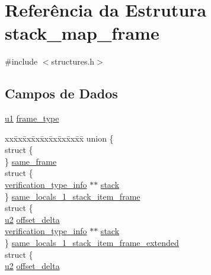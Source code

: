 \hypertarget{structstack__map__frame}{}\section{Referência da Estrutura stack\+\_\+map\+\_\+frame}
\label{structstack__map__frame}


{\ttfamily \#include $<$structures.\+h$>$}

\subsection*{Campos de Dados}
\begin{DoxyCompactItemize}
\item 
\hyperlink{lista__operandos_8h_ad9f4cdb6757615aae2fad89dab3c5470}{u1} \hyperlink{structstack__map__frame_ae7d53e0f8daea6d5738a88ffb94e575c}{frame\+\_\+type}
\item 
\begin{tabbing}
xx\=xx\=xx\=xx\=xx\=xx\=xx\=xx\=xx\=\kill
union \{\\
\>struct \{\\
\>\} \hyperlink{structstack__map__frame_a00370b3f189d19b737ae16d392b64cfd}{same\_frame}\\
\>struct \{\\
\>\>\hyperlink{structverification__type__info}{verification\_type\_info} $\ast$$\ast$ \hyperlink{structstack__map__frame_acf0d1f6336e72271bc0d91186a9360d5}{stack}\\
\>\} \hyperlink{structstack__map__frame_a716df0682a4941e130d69ee87db5545f}{same\_locals\_1\_stack\_item\_frame}\\
\>struct \{\\
\>\>\hyperlink{lista__operandos_8h_a732cde1300aafb73b0ea6c2558a7a54f}{u2} \hyperlink{structstack__map__frame_a6eb1565feda91c1edced70dc473c834d}{offset\_delta}\\
\>\>\hyperlink{structverification__type__info}{verification\_type\_info} $\ast$$\ast$ \hyperlink{structstack__map__frame_acf0d1f6336e72271bc0d91186a9360d5}{stack}\\
\>\} \hyperlink{structstack__map__frame_a6260d1ad8fd7b980baac858d66779601}{same\_locals\_1\_stack\_item\_frame\_extended}\\
\>struct \{\\
\>\>\hyperlink{lista__operandos_8h_a732cde1300aafb73b0ea6c2558a7a54f}{u2} \hyperlink{structstack__map__frame_a6eb1565feda91c1edced70dc473c834d}{offset\_delta}\\

\end{tabbing}
\end{DoxyCompactItemize}
